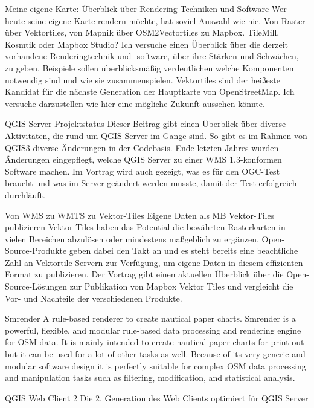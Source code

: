 %
{Meine eigene Karte: Überblick über Rendering-Techniken und Software}%
{}%
{Wer heute seine eigene Karte rendern möchte, hat soviel Auswahl wie nie. Von Raster über
Vektortiles, von Mapnik über OSM2Vectortiles zu Mapbox. TileMill, Kosmtik oder Mapbox Studio? Ich
versuche einen Überblick über die derzeit vorhandene Renderingtechnik und -software, über ihre
Stärken und Schwächen, zu geben. Beispiele sollen überblicksmäßig verdeutlichen welche Komponenten
notwendig sind und wie sie zusammenspielen. Vektortiles sind der heißeste Kandidat für die nächste
Generation der Hauptkarte von OpenStreetMap. Ich versuche darzustellen wie hier eine mögliche
Zukunft aussehen könnte.}


%
{QGIS Server Projektstatus}%
{}%
{Dieser Beitrag gibt einen Überblick über diverse Aktivitäten, die rund um QGIS Server im Gange sind. So gibt es im Rahmen von QGIS3 diverse Änderungen in der Codebasis. Ende letzten Jahres wurden Änderungen eingepflegt, welche QGIS Server zu einer WMS 1.3-konformen Software machen. Im Vortrag wird auch gezeigt, was es für den OGC-Test braucht und was im Server geändert werden musste, damit der Test erfolgreich durchläuft.}

%
{Von WMS zu WMTS zu Vektor-Tiles}%
{Eigene Daten als MB Vektor-Tiles publizieren}%
{Vektor-Tiles haben das Potential die bewährten
Rasterkarten in vielen Bereichen abzulösen oder mindestens maßgeblich zu ergänzen.
Open-Source-Produkte geben dabei den Takt an und es steht bereits eine beachtliche Zahl an
Vektortile-Servern zur Verfügung, um eigene Daten in diesem effizienten Format zu publizieren. Der
Vortrag gibt einen aktuellen Überblick über die Open-Source-Lösungen zur Publikation von Mapbox
Vektor Tiles und vergleicht die Vor- und Nachteile der verschiedenen Produkte. }

%
{Smrender}%
{A rule-based renderer to create nautical paper charts.}%
{Smrender is a powerful, flexible, and modular rule-based data processing and rendering engine for
OSM data. It is mainly intended to create nautical paper charts for print-out but it can be used for
a lot of other tasks as well. Because of its very generic and modular software design it is
perfectly suitable for complex OSM data processing and manipulation tasks such as filtering,
modification, and statistical analysis.}


%
{QGIS Web Client 2}%
{Die 2. Generation des Web Clients optimiert für QGIS Server}%
{}

